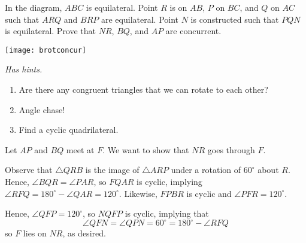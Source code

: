 In the diagram, $ ABC$ is equilateral. Point $ R$ is on $ AB$, $ P$ on $ BC$, and $ Q$ on $ AC$ such that $ ARQ$ and $ BRP$ are equilateral. Point $ N$ is constructed such that $ PQN$ is equilateral. Prove that $ NR$, $ BQ$, and $ AP$ are concurrent.

\begin{center}
\texttt{[image: brotconcur]}
\end{center}
\textit{Has hints.}
\begin{sketch}
    \begin{enumerate}
        \item Are there any congruent triangles that we can rotate to each other?
        \item Angle chase!
        \item Find a cyclic quadrilateral.
    \end{enumerate}
\end{sketch}

\begin{mdsoln}
Let $ AP$ and $ BQ$ meet at $ F$. We want to show that $ NR$ goes through $ F$.

Observe that $ \triangle QRB$ is the image of $ \triangle ARP$ under a rotation of $ 60^\circ$ about $ R$. Hence, $ \angle BQR=\angle PAR$, so $ FQAR$ is cyclic, implying $ \angle RFQ=180^\circ-\angle QAR=120^\circ$. Likewise, $ FPBR$ is cyclic and $ \angle PFR=120^\circ$.

Hence, $ \angle QFP=120^\circ$, so $ NQFP$ is cyclic, implying that\[ \angle QFN=\angle QPN=60^\circ=180^\circ-\angle RFQ\]so $ F$ lies on $ NR$, as desired.
    
\end{mdsoln}

